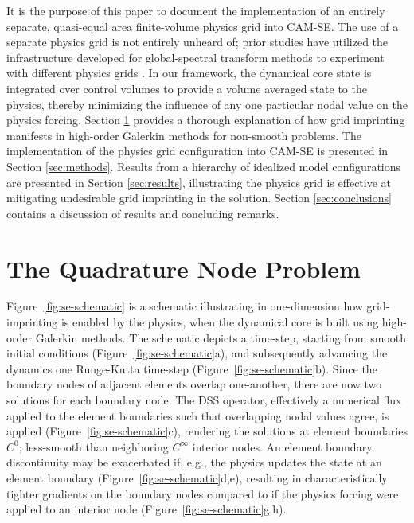 \documentclass{ametsoc}
\begin{document}
It is the purpose of this paper to document the implementation of an entirely separate, quasi-equal area finite-volume physics grid into CAM-SE. The use of a separate physics grid is not entirely unheard of; prior studies have utilized the infrastructure developed for global-spectral transform methods to experiment with different physics grids \citep{W1999T,W2014PTRSL}. In our framework, the dynamical core state is integrated over control volumes to provide a volume averaged state to the physics, thereby minimizing the influence of any one particular nodal value on the physics forcing. Section \ref{sec:nodeproblem} provides a thorough explanation of how grid imprinting manifests in high-order Galerkin methods for non-smooth problems. The implementation of the physics grid configuration into CAM-SE is presented in Section \ref{sec:methods}. Results from a hierarchy of idealized model configurations are presented in Section \ref{sec:results}, illustrating the physics grid is effective at mitigating undesirable grid imprinting in the solution. Section \ref{sec:conclusions} contains a discussion of results and concluding remarks.

\section{The Quadrature Node Problem}\label{sec:nodeproblem}

Figure~\ref{fig:se-schematic} is a schematic illustrating in one-dimension how grid-imprinting is enabled by the physics, when the dynamical core is built using high-order Galerkin methods. The schematic depicts a time-step, starting from smooth initial conditions (Figure~\ref{fig:se-schematic}a), and subsequently advancing the dynamics one Runge-Kutta time-step (Figure~\ref{fig:se-schematic}b). Since the boundary nodes of adjacent elements overlap one-another, there are now two solutions for each boundary node. The DSS operator, effectively a numerical flux applied to the element boundaries such that overlapping nodal values agree, is applied (Figure~\ref{fig:se-schematic}c), rendering the solutions at element boundaries $C^0$; less-smooth than neighboring $C^{\infty}$ interior nodes. An element boundary discontinuity may be exacerbated if, e.g., the physics updates the state at an element boundary (Figure~\ref{fig:se-schematic}d,e), resulting in characteristically tighter gradients on the boundary nodes compared to if the physics forcing were applied to an interior node (Figure~\ref{fig:se-schematic}g,h).   
\end{document}
